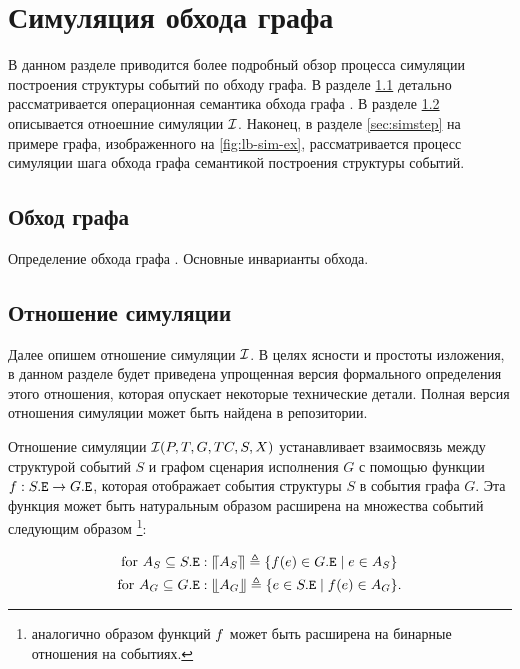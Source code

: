 \pagebreak

\section{Симуляция обхода графа \IMM}
\label{sec:simulation}

В данном разделе приводится более подробный обзор
процесса симуляции построения структуры событий по обходу \IMM графа.
В разделе \ref{sec:imm-trav} детально рассматривается
операционная семантика обхода графа \IMM.
В разделе \ref{sec:simrel} описывается
отноешние симуляции $\mathcal{I}$.
Наконец, в разделе \ref{sec:simstep} на примере
графа, изображенного на \cref{fig:lb-sim-ex},
рассматривается процесс симуляции шага обхода \IMM графа
семантикой построения структуры событий. 



\subsection{Обход графа \IMM}
\label{sec:imm-trav}

Определение обхода графа \IMM. Основные инварианты обхода.

\subsection{Отношение симуляции}
\label{sec:simrel}

Далее опишем отношение симуляции $\mathcal{I}$.
В целях ясности и простоты изложения, 
в данном разделе будет приведена упрощенная версия формального
определения этого отношения, которая опускает некоторые
технические детали. Полная версия отношения симуляции
может быть найдена в \coq репозитории. 

Отношение симуляции $\mathcal{I}(P, T, G, TC, S, X)$
устанавливает взаимосвязь между структурой событий $S$
и графом сценария исполнения $G$ с помощью
функции $f : S.{\mathtt{E}} \rightarrow G.{\mathtt{E}}$, которая отображает
события структуры $S$ в события графа $G$.
Эта функция может быть натуральным образом
расширена на множества событий следующим образом%
\footnote{аналогично образом функций $f$ может быть расширена
на бинарные отношения на событиях.}:

\begin{align*}
\text{for } A_S \subseteq S.{\mathtt{E}}        & :
  {\llceil A_S \rrceil} \triangleq \{f(e) \in G.{\mathtt{E}} \mid e \in A_S\} \\
\text{for } A_G \subseteq G.{\mathtt{E}}        & :
  {\llfloor A_G \rrfloor} \triangleq \{e \in S.{\mathtt{E}} \mid f(e) \in A_G\}.
\end{align*}

